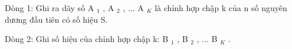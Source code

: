 Dòng 1: Ghi ra dãy số A   $_    1   $   , A   $_    2   $   , ... A   $_    K   $   là chỉnh hợp chập k của n số nguyên dương đầu tiên có số hiệu S.  

   Dòng 2: Ghi số hiệu của chỉnh hợp chập k: B   $_    1   $   , B   $_    2   $   , ... B   $_    K   $   .  

\